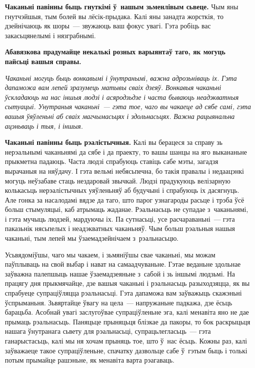 \textbf{Чаканьні павінны быць гнуткімі ў~нашым зьменлівым сьвеце.} Чым яны гнутчэйшыя, тым болей вы лёсік-прыдака. Калі яны занадта жорсткія, то дзейнічаюць як шоры~--- звужаюць ваш фокус увагі. Гэта робіць вас закасьцянелымі і нязграбнымі.

\textbf{Абавязкова прадумайце некалькі розных варыянтаў таго, як могуць пайсьці вашыя справы.}

\emph{Чаканьні могуць быць вонкавымі і ўнутранымі, важна адрозьніваць іх. Гэта дапаможа вам лепей зразумець матывы сваіх дзеяў. Вонкавыя чаканьні ўскладаюць на нас іншыя людзі і асяродзьдзе і часта бываюць неадэкватныя сытуацыі. Унутраныя чаканьні~--- гэта тое, чаго вы чакаеце ад сябе самі, гэта вашыя ўяўленьні аб сваіх магчымасьцях і здольнасьцях. Важна рацыянальна ацэньваць і тыя, і іншыя.}

\textbf{Чаканьні павінны быць рэалістычныя.} Калі вы берацеся за справу зь нерэальнымі чаканьнямі да сябе і да праекту, то вашы шанцы на яго выкананьне прыкметна падаюць. Часта людзі спрабуюць ставіць сабе мэты, загадзя вырачаныя на няўдачу. І гэта вельмі небясьпечна, бо такія правалы і недаацэнкі могуць неўзабаве стаць нездаровай звычкай. Людзі прадукуюць велізарную колькасьць нерэалістычных уяўленьняў аб будучыні і спрабуюць іх дасягнуць. Але гонка за насалодамі вядзе да таго, што парог узнагароды расьце і трэба ўсё больш стымуляцыі, каб атрымаць жаданае. Рэальнасьць не супадае з~чаканьнямі, і гэта мучыць людзей, мардуючы іх. Па сутнасьці, усе расчараваньні~--- гэта паказьнік нясьпелых і неадэкватных чаканьняў. Чым больш рэальныя нашыя чаканьні, тым лепей мы ўзаемадзейнічаем з~рэальнасьцю.

Усьвядоміўшы, чаго мы чакаем, і зьмяніўшы свае чаканьні, мы можам паўплываць на свой выбар і нават на самаадчуваньне. Гэтае веданьне здольнае заўважна палепшыць нашае ўзаемадзеяньне з~сабой і зь іншымі людзьмі. На працягу дня прыкмячайце, дзе вашыя чаканьні і рэальнасьць разыходзяцца, як вы спрабуеце супраціўляцца рэальнасьці. Гэта дапаможа вам заўважыць скажэньні ўспрыманьня. Зьвяртайце ўвагу на цела~--- напружаньне падкажа, дзе ёсьць барацьба. Асобнай увагі заслугоўвае супраціўленьне эга, калі менавіта яно не дае прымаць рэальнасьць. Паняцьце прыняцьця блізкае да пакоры, то бок раскрыцьця нашага ўнутранага сьвету для рэальнасьці, супрацьлегласьць~--- гэта ганарыстасьць, калі мы ня хочам прыняць тое, што ў~нас ёсьць. Кожны раз, калі заўважаеце такое супраціўленьне, спачатку дазвольце сабе ў~гэтым быць і толькі потым прымайце рашэньне, як менавіта варта рэагаваць.

